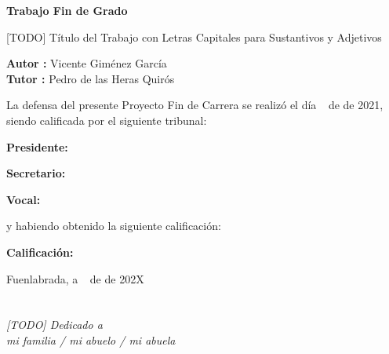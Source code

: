 \documentclass[a4paper, 12pt]{book}
\begin{document}
    \vspace{-4cm}
    \begin{center}
        \LARGE
        \textbf{Trabajo Fin de Grado}

        \vspace{1cm}
        \large
        [TODO] Título del Trabajo con Letras Capitales para Sustantivos y Adjetivos

        \vspace{1cm}
        \large
        \textbf{Autor :} Vicente Giménez García \\
        \textbf{Tutor :} Pedro de las Heras Quirós

    \end{center}

    \vspace{1cm}
    La defensa del presente Proyecto Fin de Carrera se realizó el día \qquad$\;\,$ de \qquad\qquad\qquad\qquad \newline de 2021, siendo calificada por el siguiente tribunal:


    \vspace{0.5cm}
    \textbf{Presidente:}

    \vspace{1.2cm}
    \textbf{Secretario:}

    \vspace{1.2cm}
    \textbf{Vocal:}


    \vspace{1.2cm}
    y habiendo obtenido la siguiente calificación:

    \vspace{1cm}
    \textbf{Calificación:}


    \vspace{1cm}
    \begin{flushright}
        Fuenlabrada, a \qquad$\;\,$ de \qquad\qquad\qquad\qquad de 202X
    \end{flushright}


    \chapter*{}
    \begin{flushright}
        \textit{[TODO] Dedicado a \\
        mi familia / mi abuelo / mi abuela}
    \end{flushright}
\end{document}

